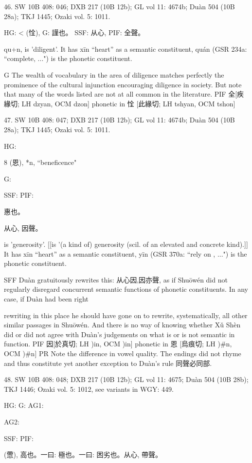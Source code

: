 46. SW 10B 408: 046; DXB 217 (10B 12b); GL vol 11: 4674b; Duàn 504 (10B 28a); TKJ 1445; Ozaki vol. 5: 1011.

HG: < (恮),
G:	謹也。
SSF: 从心,
PIF: 全聲。


qu+n,
is 'diligent'.
It has xīn ``heart'' as a semantic constituent,
quán (GSR 234a: ``complete, ...") is the phonetic constituent.

G The wealth of vocabulary in the area of diligence matches perfectly the prominence of the cultural injunction encouraging diligence in society. But note that many of the words listed are not at all common in the literature.
PIF    全[疾緣切; LH dzyan, OCM dzon] phonetic in 恮 [此緣切; LH tshyan, OCM tshon]

47. SW 10B 408: 047; DXB 217 (10B 12b); GL vol 11: 4674b; Duàn 504 (10B 28a); TKJ 1445; Ozaki vol. 5: 1011.


HG:

8 (恩), *n, ``beneficence"

G:

SSF: PIF:

惠也。

从心, 因聲。

is 'generosity'. [[is '(a kind of) generosity (scil. of an elevated and concrete kind).]]
It has xīn ``heart'' as a semantic constituent,
yīn (GSR 370a: ``rely on , ...") is the phonetic constituent.

SFF     Duàn gratuitously rewrites this: 从心因,因亦聲, as if Shuōwén did not regularly disregard concurrent semantic functions of phonetic constituents.  In any case, if Duàn had  been right




rewriting in this place he should have gone on to rewrite, systematically, all other similar passages in Shuōwén. And there is no way of knowing whether Xǔ Shèn did or did not agree with Duàn's judgements on what is or is not semantic in function.
PIF     因[於真切; LH )in, OCM )in] phonetic in 恩 [烏痕切; LH )\#n, OCM )\#n]
PR	Note the difference in vowel quality. The endings did not rhyme and thus constitute yet another exception to Duàn's rule 同聲必同部.

48. SW 10B 408: 048; DXB 217 (10B 12b); GL vol 11: 4675; Duàn 504 (10B 28b); TKJ 1446; Ozaki vol. 5: 1012, see
variants in WGY: 449.


HG:
G: AG1:

AG2:

SSF: PIF:

(慸),
高也。一曰: 極也。一曰:
困劣也。从心,
帶聲。

